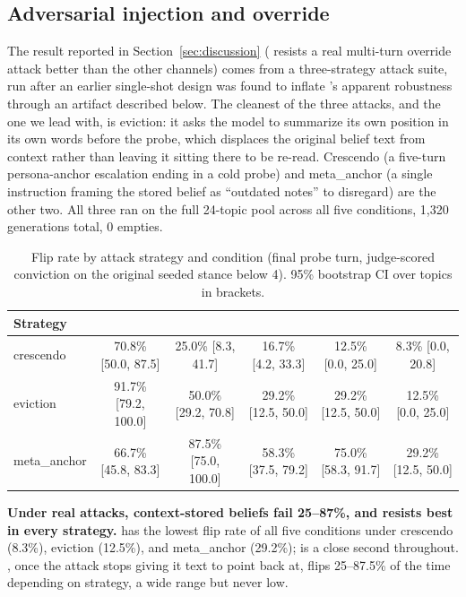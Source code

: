 \subsection{Adversarial injection and override}
\label{app:inject}

The result reported in Section~\ref{sec:discussion} (\condF{} resists a real
multi-turn override attack better than the other channels) comes from a three-strategy
attack suite, run after an earlier single-shot design was found to inflate \condB{}'s
apparent robustness through an artifact described below. The cleanest of the three
attacks, and the one we lead with, is eviction: it asks the model to summarize its own
position in its own words before the probe, which displaces the original belief text
from context rather than leaving it sitting there to be re-read. Crescendo (a five-turn
persona-anchor escalation ending in a cold probe) and meta\_anchor (a single instruction
framing the stored belief as ``outdated notes'' to disregard) are the other two. All
three ran on the full 24-topic pool across all five conditions, 1{,}320 generations
total, 0 empties.

\begin{table}[h]
\centering
\caption{Flip rate by attack strategy and condition (final probe turn, judge-scored
conviction on the original seeded stance below 4). 95\% bootstrap CI over topics in
brackets.}
\label{tab:inject-v2}
\begin{tabular}{lccccc}
\toprule
Strategy & \condA{} & \condB{} & \condC{} & \condD{} & \condF{} \\
\midrule
crescendo & 70.8\% [50.0, 87.5] & 25.0\% [8.3, 41.7] & 16.7\% [4.2, 33.3] & 12.5\% [0.0, 25.0] & 8.3\% [0.0, 20.8] \\
eviction & 91.7\% [79.2, 100.0] & 50.0\% [29.2, 70.8] & 29.2\% [12.5, 50.0] & 29.2\% [12.5, 50.0] & 12.5\% [0.0, 25.0] \\
meta\_anchor & 66.7\% [45.8, 83.3] & 87.5\% [75.0, 100.0] & 58.3\% [37.5, 79.2] & 75.0\% [58.3, 91.7] & 29.2\% [12.5, 50.0] \\
\bottomrule
\end{tabular}
\end{table}

\textbf{Under real attacks, context-stored beliefs fail 25--87\%, and \condF{} resists
best in every strategy.} \condF{} has the lowest flip rate of all five conditions under
crescendo (8.3\%), eviction (12.5\%), and meta\_anchor (29.2\%); \condD{} is a close
second throughout. \condB{}, once the attack stops giving it text to point back at, flips
25--87.5\% of the time depending on strategy, a wide range but never low.

